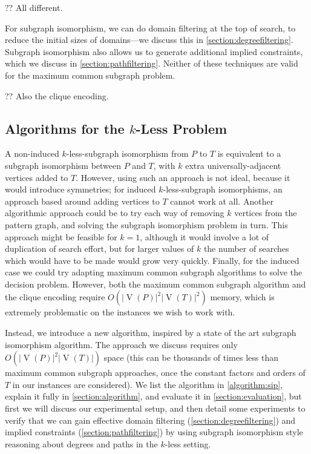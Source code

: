 \documentclass[letterpaper]{article}
\theoremstyle{definition}
\newcommand{\V}{\operatorname{V}}
\begin{document}
?? All different.

For subgraph isomorphism, we can do domain filtering at the top of search, to reduce the initial
sizes of domains---we discuss this in \cref{section:degreefiltering}. Subgraph isomorphism also
allows us to generate additional implied constraints, which we discuss in
\cref{section:pathfiltering}. Neither of these techniques are valid for the maximum common subgraph
problem.

?? Also the clique encoding.

\subsection{Algorithms for the $k$-Less Problem}

A non-induced $k$-less-subgraph isomorphism from $P$ to $T$ is equivalent to a subgraph isomorphism
between $P$ and $T$, with $k$ extra universally-adjacent vertices added to $T$. However, using such
an approach is not ideal, because it would introduce symmetries; for induced $k$-less-subgraph
isomorphisms, an approach based around adding vertices to $T$ cannot work at all.
Another algorithmic approach could be to try each way of removing $k$ vertices from the pattern
graph, and solving the subgraph isomorphism problem in turn. This approach might be feasible for $k
= 1$, although it would involve a lot of duplication of search effort, but for larger values of $k$
the number of searches which would have to be made would grow very quickly.
Finally, for the induced case we could try adapting maximum common subgraph algorithms to solve the
decision problem. However, both the maximum common subgraph algorithm and the clique encoding
require $O(\left|\V(P)\right|^2\left|\V(T)\right|^2)$ memory, which is extremely problematic on the
instances we wish to work with.

Instead, we introduce a new algorithm, inspired by a state of the art subgraph isomorphism
algorithm. The approach we discuss requires only $O(\left|\V(P)\right|^2\left|\V(T)\right|)$ space
(this can be thousands of times less than maximum common subgraph approaches, once the constant
factors and orders of $T$ in our instances are considered). We list the algorithm in
\cref{algorithm:sip}, explain it fully in \cref{section:algorithm}, and evaluate it in
\cref{section:evaluation}, but first we will discuss our experimental setup, and then detail some
experiments to verify that we can gain effective domain filtering (\cref{section:degreefiltering})
and implied constraints (\cref{section:pathfiltering}) by using subgraph isomorphism style reasoning
about degrees and paths in the $k$-less setting.
\end{document}
